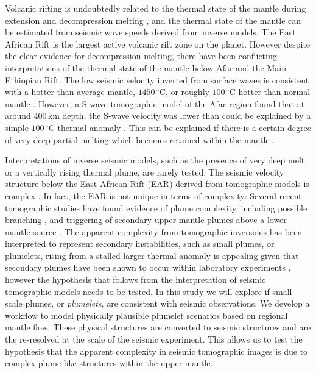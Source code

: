 \documentclass[a4paper,10pt,twocolumn]{paper}
\begin{document}
Volcanic rifting is undoubtedly related to the thermal state of the mantle during extension and decompression melting \citep[e.g.][]{white-1989}, and the thermal state of the mantle can be estimated from seismic wave speeds derived from inverse models. The East African Rift is the largest active volcanic rift zone on the planet. However despite the clear evidence for decompression melting, there have been conflicting interpretations of the thermal state of the mantle below Afar and the Main Ethiopian Rift. The low seismic velocity inverted from surface waves is consistent with a hotter than average mantle, $1450\,^{\circ}$C, or roughly $100\,^{\circ}$C hotter than normal mantle \citep{armitage-etal-epsl-2015}. However, a S-wave tomographic model of the Afar region found that at around 400\,km depth, the S-wave velocity was lower than could be explained by a simple $100\,^{\circ}$C thermal anomaly \citep{thompson-etal-2015}. This can be explained if there is a certain degree of very deep partial melting which becomes retained within the mantle \citep{thompson-etal-2015}.

Interpretations of inverse seismic models, such as the presence of very deep melt, or a vertically rising thermal plume, are rarely tested. The seismic velocity structure below the East African Rift (EAR) derived from tomographic models is complex \citep{civiero-etal-2015,civiero-etal-2016}. In fact, the EAR is not unique in terms of complexity: Several recent tomographic studies have found evidence of plume complexity, including possible branching \citep{rickers-etal-2013}, and  triggering of secondary upper-mantle plumes above a lower-mantle source \citep{civiero-etal-2018,goes-etal-1999,saki-etal-2015}. The apparent complexity from tomographic inversions has been interpreted to represent secondary instabilities, such as small plumes, or plumelets, rising from a stalled larger thermal anomaly is appealing given that secondary plumes have been shown to occur within laboratory experiments \citep[e.g.]{kumagai-etal-2007}, however the hypothesis that follows from the interpretation of seismic tomographic models needs to be tested. In this study we will explore if small-scale plumes, or \emph{plumelets}, are consistent with seismic observations. We develop a workflow to model physically plausible plumelet scenarios based on regional mantle flow. These physical structures are converted to seismic structures and are the re-resolved at the scale of the seismic experiment. This allows us to test the hypothesis that the apparent complexity in seismic tomographic images is due to complex plume-like structures within the upper mantle.
\end{document}

